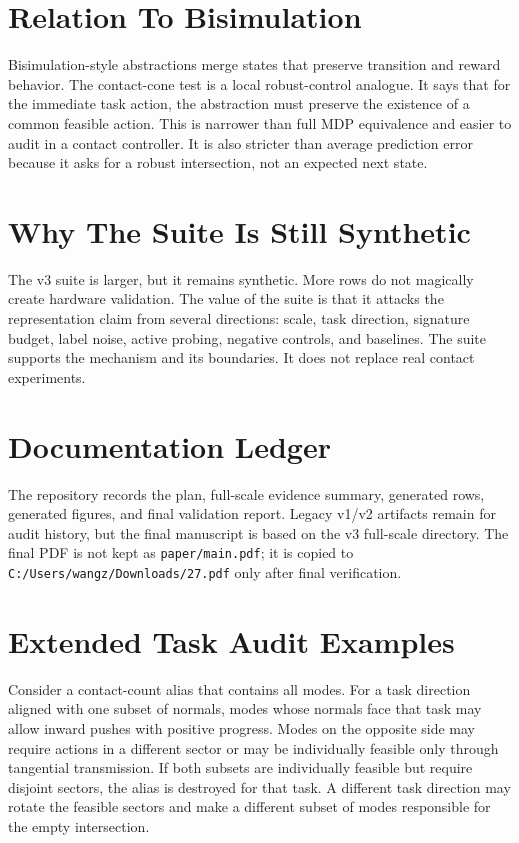\documentclass{article}
\begin{document}
\section{Relation To Bisimulation}
Bisimulation-style abstractions merge states that preserve transition and reward behavior. The contact-cone test is a local robust-control analogue. It says that for the immediate task action, the abstraction must preserve the existence of a common feasible action. This is narrower than full MDP equivalence and easier to audit in a contact controller. It is also stricter than average prediction error because it asks for a robust intersection, not an expected next state.

\section{Why The Suite Is Still Synthetic}
The v3 suite is larger, but it remains synthetic. More rows do not magically create hardware validation. The value of the suite is that it attacks the representation claim from several directions: scale, task direction, signature budget, label noise, active probing, negative controls, and baselines. The suite supports the mechanism and its boundaries. It does not replace real contact experiments.

\section{Documentation Ledger}
The repository records the plan, full-scale evidence summary, generated rows, generated figures, and final validation report. Legacy v1/v2 artifacts remain for audit history, but the final manuscript is based on the v3 full-scale directory. The final PDF is not kept as \texttt{paper/main.pdf}; it is copied to \texttt{C:/Users/wangz/Downloads/27.pdf} only after final verification.

\section{Extended Task Audit Examples}
Consider a contact-count alias that contains all modes. For a task direction aligned with one subset of normals, modes whose normals face that task may allow inward pushes with positive progress. Modes on the opposite side may require actions in a different sector or may be individually feasible only through tangential transmission. If both subsets are individually feasible but require disjoint sectors, the alias is destroyed for that task. A different task direction may rotate the feasible sectors and make a different subset of modes responsible for the empty intersection.
\end{document}
